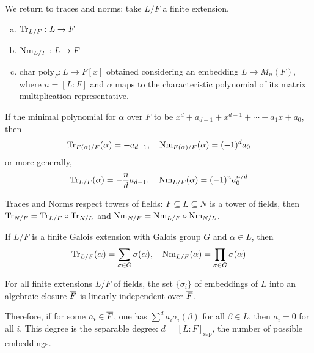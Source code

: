 We return to traces and norms: take $L/F$ a finite extension.
\begin{enumerate}[(a)]
\item $\text{Tr}_{L/F}: L \to F$
\item $\text{Nm}_{L/F}: L \to F$
\item $\text{char poly}_F: L \to F[x]$ obtained considering an embedding $L \to M_n(F)$, where $n=[L:F]$ and $\alpha$ maps to the characteristic polynomial of its matrix multiplication representative. 
\end{enumerate}

\begin{cor}
If the minimal polynomial for $\alpha$ over $F$ to be $x^d+ a_{d-1} + x^{d-1} + \cdots + a_1 x+a_0$, then	
	\[
	\text{Tr}_{F(\alpha)/F}(\alpha)= -a_{d-1}, \quad \text{Nm}_{F(\alpha)/F}(\alpha)=(-1)^d a_0
	\]
or more generally,
	\[
	\text{Tr}_{L/F}(\alpha)= - \dfrac{n}{d} a_{d-1}, \quad \text{Nm}_{L/F}(\alpha)= (-1)^n a_0^{n/d}
	\]
\end{cor}

\begin{cor}
Traces and Norms respect towers of fields: $F \subseteq L \subseteq N$ is a tower of fields, then $\text{Tr}_{N/F}= \text{Tr}_{L/F} \circ \text{Tr}_{N/L}$ and $\text{Nm}_{N/F}=\text{Nm}_{L/F} \circ \text{Nm}_{N/L}$.
\end{cor} 

\begin{thm}
If $L/F$ is a finite Galois extension with Galois group $G$ and $\alpha \in L$, then
	\[
	\text{Tr}_{L/F}(\alpha)= \sum_{\sigma \in G} \sigma(\alpha), \quad \text{Nm}_{L/F}(\alpha)= \prod_{\sigma \in G} \sigma(\alpha) 
	\]
\end{thm}

\begin{thm}[Dedekind]
For all finite extensions $L/F$ of fields, the set $\{\sigma_i\}$ of embeddings of $L$ into an algebraic closure $\overline{F}$ is linearly independent over $\overline{F}$. 
\end{thm}

Therefore, if for some $a_i \in \overline{F}$, one has $\sum^d a_i \sigma_i(\beta)$ for all $\beta \in L$, then $a_i=0$ for all $i$. This degree is the separable degree: $d=[L:F]_{\text{sep}}$, the number of possible embeddings. \\

